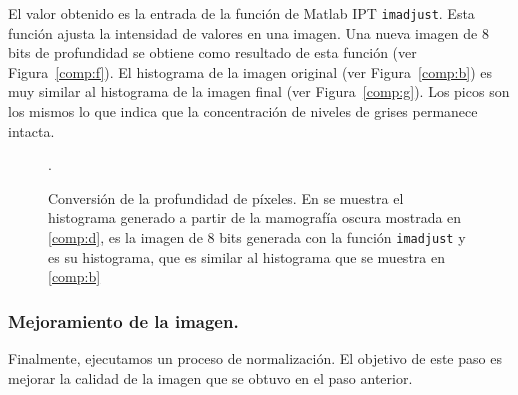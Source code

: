 El valor obtenido es la entrada de la función de Matlab IPT \texttt{imadjust}.
Esta función ajusta la intensidad de valores en una imagen. Una nueva imagen de
8 bits de profundidad se obtiene como resultado de esta función (ver
Figura~\ref{comp:f}). El histograma de la imagen original (ver
Figura~\ref{comp:b}) es muy similar al histograma de la imagen final (ver
Figura~\ref{comp:g}). Los picos son los mismos lo que indica que la
concentración de niveles de grises permanece intacta.

\begin{figure}[h]
  \begin{center}
    \hspace{12pt}
    \hspace{12pt}
  \end{center}

  \caption[Conversión de la profundidad de píxeles]
  {Conversión de la profundidad de píxeles. En \protect{} se
  muestra el histograma generado a partir de la mamografía oscura mostrada en
  \protect\ref{comp:d}, \protect{} es la imagen de 8 bits
  generada con la función \texttt{imadjust} y \protect{} es su
  histograma, que es similar al histograma que se muestra en \ref{comp:b}}. 
  
  \label{img:shrinking-two}
\end{figure}

\subsubsection{Mejoramiento de la imagen.}

Finalmente, ejecutamos un proceso de normalización. El objetivo de este paso es
mejorar la calidad de la imagen que se obtuvo en el paso anterior.

%
